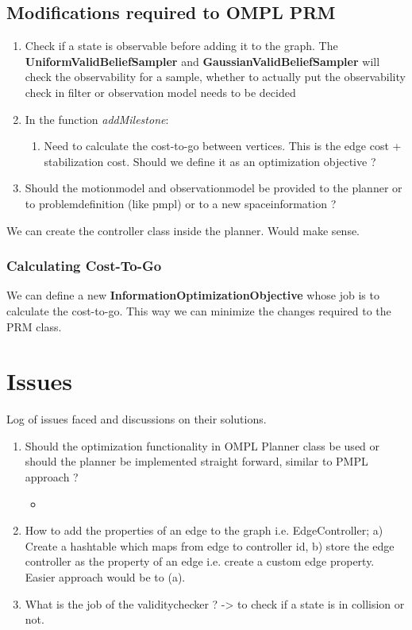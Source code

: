 \subsection{Modifications required to OMPL PRM}

\begin{enumerate}

 \item Check if a state is observable before adding it to the graph. The \textbf{UniformValidBeliefSampler} and   \textbf{GaussianValidBeliefSampler} will check the observability for a sample, whether to actually put the observability check in filter or observation model needs to be decided
   
 \item In the function \textit{addMilestone}:
  \begin{enumerate}
   \item Need to calculate the cost-to-go between vertices. This is the edge cost + stabilization cost. Should we define it as an optimization objective ?
  \end{enumerate}

  \item Should the motionmodel and observationmodel be provided to the planner or to problemdefinition (like pmpl) or to a new spaceinformation ?
\end{enumerate}

We can create the controller class inside the planner. Would make sense.

\subsubsection{Calculating Cost-To-Go}

We can define a new \textbf{InformationOptimizationObjective} whose job is to calculate the cost-to-go. This way we can minimize the changes required to the PRM
class.


\section{Issues}
Log of issues faced and discussions on their solutions.

\begin{enumerate}
 \item Should the optimization functionality in OMPL Planner class be used or should the planner be implemented straight forward, similar to PMPL approach ?
    \begin{itemize}
     \item 
    \end{itemize}
\item How to add the properties of an edge to the graph i.e. EdgeController; a) Create a hashtable which maps from edge to controller id, b) store the edge controller as the property of an edge i.e. create a custom edge property. Easier approach would be to (a).

 \item What is the job of the validitychecker ? -> to check if a state is in collision or not. 

\end{enumerate}
